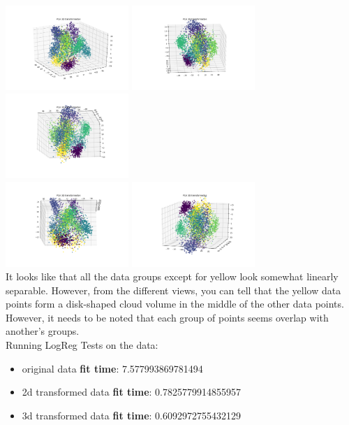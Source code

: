 \documentclass[12pt]{article}
\begin{document}
\begin{enumerate}[leftmargin=\parindent,align=left,labelwidth=\parindent,noitemsep]
\begin{itemize}[topsep=10pt]
    \includegraphics[width=0.35\textwidth]{pca_digits_3d1}
    \includegraphics[width=0.35\textwidth]{pca_digits_3d2}
    \includegraphics[width=0.35\textwidth]{pca_digits_3d3} \\
    \includegraphics[width=0.35\textwidth]{pca_digits_3d4}
    \includegraphics[width=0.35\textwidth]{pca_digits_3d5} \\
    It looks like that all the data groups except for yellow look somewhat linearly separable. However, from the different views, you can tell that the yellow data points form a disk-shaped cloud volume in the middle of the other data points. However, it needs to be noted that each group of points seems overlap with another's groups. \\
    Running LogReg Tests on the data: \\
    \begin{itemize}
        \item original data \textbf{fit time}: 7.577993869781494
        \item 2d transformed data \textbf{fit time}: 0.7825779914855957
        \item 3d transformed data \textbf{fit time}: 0.6092972755432129 \\


\end{itemize}
\end{itemize}
\end{enumerate}
\end{document}
